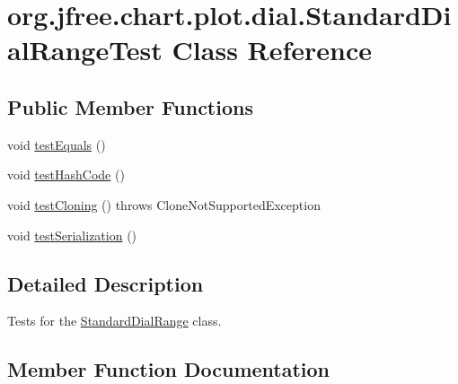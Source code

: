 \hypertarget{classorg_1_1jfree_1_1chart_1_1plot_1_1dial_1_1_standard_dial_range_test}{}\section{org.\+jfree.\+chart.\+plot.\+dial.\+Standard\+Dial\+Range\+Test Class Reference}
\label{classorg_1_1jfree_1_1chart_1_1plot_1_1dial_1_1_standard_dial_range_test}
\subsection*{Public Member Functions}
\begin{DoxyCompactItemize}
\item 
void \mbox{\hyperlink{classorg_1_1jfree_1_1chart_1_1plot_1_1dial_1_1_standard_dial_range_test_acb04099e004fcffe882841a6c1496154}{test\+Equals}} ()
\item 
void \mbox{\hyperlink{classorg_1_1jfree_1_1chart_1_1plot_1_1dial_1_1_standard_dial_range_test_a62505a7e6fd858b15a53ccc0911956b1}{test\+Hash\+Code}} ()
\item 
void \mbox{\hyperlink{classorg_1_1jfree_1_1chart_1_1plot_1_1dial_1_1_standard_dial_range_test_ae461e872db01eacbd954c7e0953e6f06}{test\+Cloning}} ()  throws Clone\+Not\+Supported\+Exception 
\item 
void \mbox{\hyperlink{classorg_1_1jfree_1_1chart_1_1plot_1_1dial_1_1_standard_dial_range_test_a6b9b9670d5caed1ff52a0a462d323596}{test\+Serialization}} ()
\end{DoxyCompactItemize}


\subsection{Detailed Description}
Tests for the \mbox{\hyperlink{classorg_1_1jfree_1_1chart_1_1plot_1_1dial_1_1_standard_dial_range}{Standard\+Dial\+Range}} class. 

\subsection{Member Function Documentation}
\mbox{\label{classorg_1_1jfree_1_1chart_1_1plot_1_1dial_1_1_standard_dial_range_test_ae461e872db01eacbd954c7e0953e6f06}} 
